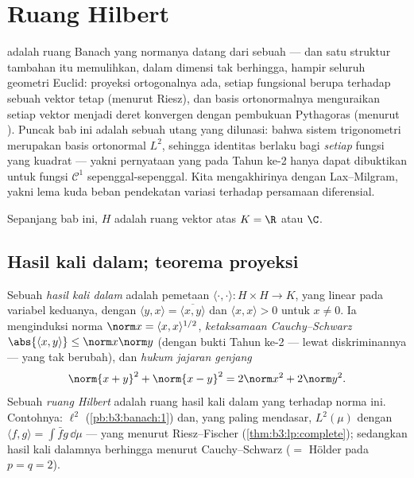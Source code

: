 \chapter{Ruang Hilbert}\label{ch:b3:hilbert}

 adalah ruang Banach yang normanya datang dari
sebuah  --- dan satu struktur tambahan itu memulihkan, dalam
dimensi tak berhingga, hampir seluruh geometri Euclid:
proyeksi ortogonalnya ada, setiap fungsional  berupa
 terhadap sebuah vektor tetap (menurut Riesz), dan
basis ortonormalnya menguraikan setiap vektor menjadi deret konvergen dengan
pembukuan Pythagoras (menurut ). Puncak bab ini adalah sebuah
utang yang dilunasi: bahwa sistem trigonometri merupakan basis ortonormal
$L^2$, sehingga identitas  berlaku bagi \emph{setiap}
fungsi yang  kuadrat --- yakni pernyataan yang pada Tahun ke-2 hanya
dapat dibuktikan untuk fungsi $\mathcal C^1$ sepenggal-sepenggal. Kita mengakhirinya dengan
Lax--Milgram, yakni lema kuda beban pendekatan variasi
terhadap persamaan diferensial.

Sepanjang bab ini, $H$ adalah ruang vektor atas $K = \R$ atau $\C$.

\section{Hasil kali dalam; teorema proyeksi}

\begin{definition}\label{def:b3:hilbert:inner}
Sebuah \emph{hasil kali dalam} adalah pemetaan $\langle
\cdot,\cdot\rangle \colon H\times H \to K$, yang linear pada
variabel keduanya, dengan $\langle y, x\rangle =
\overline{\langle x, y\rangle}$ dan $\langle x, x\rangle > 0$
untuk $x \neq 0$. Ia menginduksi norma $\norm x = \langle x,
x\rangle^{1/2}$, \emph{ketaksamaan Cauchy--Schwarz}
$\abs{\langle x, y\rangle} \leq \norm x\norm y$ (dengan bukti Tahun
ke-2 --- lewat diskriminannya --- yang tak berubah), dan
\emph{hukum jajaran genjang}
\[
\norm{x + y}^2 + \norm{x - y}^2 = 2\norm x^2 + 2\norm y^2 .
\]
Sebuah \emph{ruang Hilbert} adalah ruang
hasil kali dalam yang  terhadap norma ini. Contohnya: $\ell^2$
(\cref{pb:b3:banach:1}) dan, yang paling mendasar, $L^2(\mu)$
dengan $\langle f, g\rangle = \int\bar fg\,\dd\mu$ ---
yang  menurut Riesz--Fischer (\cref{thm:b3:lp:complete}); sedangkan
hasil kali dalamnya berhingga menurut Cauchy--Schwarz ($=$ Hölder pada
$p = q = 2$).
\end{definition}

